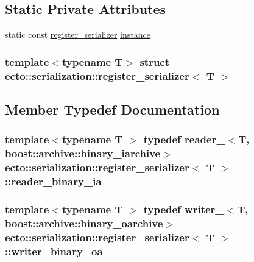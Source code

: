 \subsection*{\-Static \-Private \-Attributes}
\begin{DoxyCompactItemize}
\item 
static const \hyperlink{structecto_1_1serialization_1_1register__serializer}{register\-\_\-serializer} \hyperlink{structecto_1_1serialization_1_1register__serializer_a742ed82697621237f599631009e47e05}{instance}
\end{DoxyCompactItemize}
\subsubsection*{template$<$typename T$>$ struct ecto\-::serialization\-::register\-\_\-serializer$<$ T $>$}



\subsection{\-Member \-Typedef \-Documentation}
\hypertarget{structecto_1_1serialization_1_1register__serializer_a7783674d19bdb5a7f2143953d6a7302f}{
\subsubsection[{reader\-\_\-binary\-\_\-ia}]{\setlength{\rightskip}{0pt plus 5cm}template$<$typename T $>$ typedef {\bf reader\-\_\-}$<$\-T, boost\-::archive\-::binary\-\_\-iarchive$>$ {\bf ecto\-::serialization\-::register\-\_\-serializer}$<$ \-T $>$\-::{\bf reader\-\_\-binary\-\_\-ia}}}\label{structecto_1_1serialization_1_1register__serializer_a7783674d19bdb5a7f2143953d6a7302f}
\hypertarget{structecto_1_1serialization_1_1register__serializer_a31c9f04624076aa209e66232a511c627}{
\subsubsection[{writer\-\_\-binary\-\_\-oa}]{\setlength{\rightskip}{0pt plus 5cm}template$<$typename T $>$ typedef {\bf writer\-\_\-}$<$\-T, boost\-::archive\-::binary\-\_\-oarchive$>$ {\bf ecto\-::serialization\-::register\-\_\-serializer}$<$ \-T $>$\-::{\bf writer\-\_\-binary\-\_\-oa}}}\label{structecto_1_1serialization_1_1register__serializer_a31c9f04624076aa209e66232a511c627}


